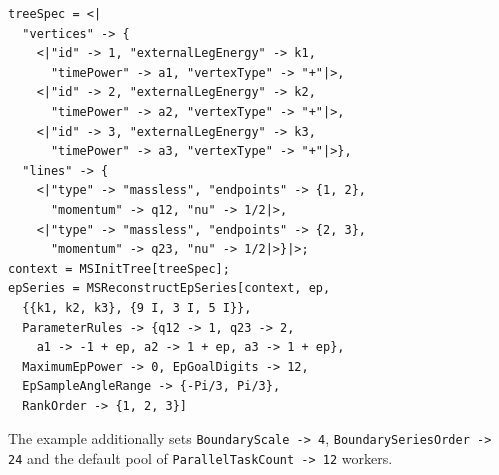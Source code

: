 \documentclass[11pt,a4paper]{article}
\numberwithin{table}{section}
\begin{document}
\begin{verbatim}
treeSpec = <|
  "vertices" -> {
    <|"id" -> 1, "externalLegEnergy" -> k1,
      "timePower" -> a1, "vertexType" -> "+"|>,
    <|"id" -> 2, "externalLegEnergy" -> k2,
      "timePower" -> a2, "vertexType" -> "+"|>,
    <|"id" -> 3, "externalLegEnergy" -> k3,
      "timePower" -> a3, "vertexType" -> "+"|>},
  "lines" -> {
    <|"type" -> "massless", "endpoints" -> {1, 2},
      "momentum" -> q12, "nu" -> 1/2|>,
    <|"type" -> "massless", "endpoints" -> {2, 3},
      "momentum" -> q23, "nu" -> 1/2|>}|>;
context = MSInitTree[treeSpec];
epSeries = MSReconstructEpSeries[context, ep,
  {{k1, k2, k3}, {9 I, 3 I, 5 I}},
  ParameterRules -> {q12 -> 1, q23 -> 2,
    a1 -> -1 + ep, a2 -> 1 + ep, a3 -> 1 + ep},
  MaximumEpPower -> 0, EpGoalDigits -> 12,
  EpSampleAngleRange -> {-Pi/3, Pi/3},
  RankOrder -> {1, 2, 3}]
\end{verbatim}
The example additionally sets \texttt{BoundaryScale -> 4}, \texttt{BoundarySeriesOrder -> 24}
and the default pool of \texttt{ParallelTaskCount -> 12} workers.
\end{document}
